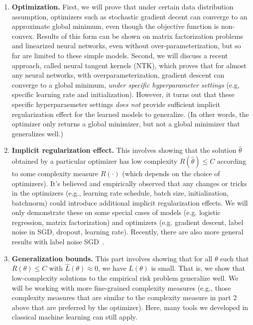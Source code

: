 \begin{enumerate}
    \item \textbf{Optimization.} First, we will prove that under certain data distribution assumption, optimizers such as stochastic gradient decent can converge to an approximate global minimum, even though the objective function is non-convex. Results of this form can be shown on matrix factorization problems and linearized neural networks, even without over-parameterization, but so far are limited to these simple models.  Second, we will discuss a recent approach, called neural tangent kernels (NTK), which proves that for almost any neural networks, with overparameterization, gradient descent can converge to a global minimum, \textit{under specific hyperparameter settings} (e.g, specific learning rate and initialization). However, it turns out that these specific hyperparaemeter settings \textit{does not} provide sufficient implicit regularization effect for the learned models to generalize. (In other words, the optimizer only returns a global minimizer, but not a global minimizer that generalizes well.)
    
    \item \textbf{Implicit regularization effect.} This involves showing that the solution $\hat{\theta}$ obtained by a particular optimizer has low complexity $R(\hat{\theta})\leq C$ according to some complexity measure $R(\cdot)$ (which depends on the choice of optimizers). It's believed and empirically observed that any changes or tricks in the optimizers (e.g., learning rate schedule, batch size, initialization, batchnorm) could introduce additional implicit regularization effects. We will only demonstrate these on some special cases of models (e.g. logistic regression, matrix factorization) and optimizers (e.g. gradient descent, label noise in SGD, dropout, learning rate). Recently, there are also more general results with label noise SGD~\citep{blanc2019implicit,damian2021label}. 
    
    \item \textbf{Generalization bounds.} This part involves showing that for all $\theta$ such that $R(\theta)\leq C$ with $\hat{L}(\theta)\approx 0$, we have $L(\theta)$ is small. That is, we show that low-complexity solutions to the empirical risk problem generalize well. We will be working with more fine-grained complexity measures (e.g., those complexity measures that are similar to the complexity measure in part 2 above that are preferred by the optimizer). Here, many tools we developed in classical machine learning can still apply.
\end{enumerate}